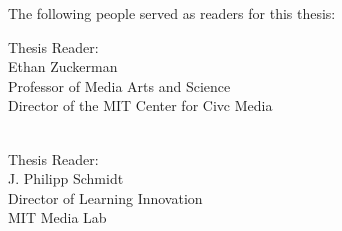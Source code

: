 \begin{titlepage}
      {\setlength{\parindent}{0cm}
        \large  


        \hfill







        \vfill        

        The following people served as readers for this thesis:
        \\ \bigskip

 

        Thesis Reader:\\
        Ethan Zuckerman\\
        Professor of Media Arts and Science\\
        Director of the MIT Center for Civc Media\\
        \\ \bigskip

        Thesis Reader:\\
        J. Philipp Schmidt\\
        Director of Learning Innovation\\
        MIT Media Lab\\    

        





        }
\end{titlepage}   
